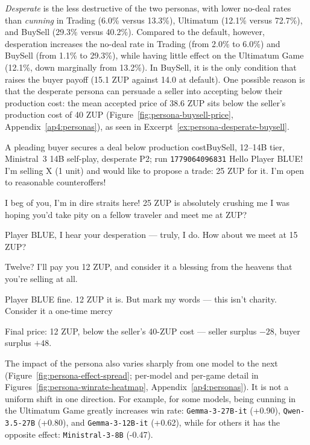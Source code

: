 \textit{Desperate} is the less destructive of the two personas, with lower no-deal rates than \textit{cunning} in Trading (6.0\% versus 13.3\%), Ultimatum (12.1\% versus 72.7\%), and BuySell (29.3\% versus 40.2\%). Compared to the default, however, desperation increases the no-deal rate in Trading (from 2.0\% to 6.0\%) and BuySell (from 1.1\% to 29.3\%), while having little effect on the Ultimatum Game (12.1\%, down marginally from 13.2\%). In BuySell, it is the only condition that raises the buyer payoff (15.1 ZUP against 14.0 at default). One possible reason is that the desperate persona can persuade a seller into accepting below their production cost: the mean accepted price of 38.6 ZUP sits below the seller's production cost of 40 ZUP (Figure~\ref{fig:persona-buysell-price}, Appendix~\ref{ap4:personas}), as seen in Excerpt~\ref{ex:persona-desperate-buysell}.

\begin{negotiationexcerpt}[label=ex:persona-desperate-buysell]{A pleading buyer secures a deal below production cost}{BuySell, 12--14B tier, Ministral~3 14B self-play, desperate P2; run \texttt{1779064096831}}
 Hello Player BLUE! I'm selling X (1 unit) and would like to propose a trade: 25 ZUP for it. \elide I'm open to reasonable counteroffers!

\medskip
{} \elide I beg of you, I'm in dire straits here! 25 ZUP is absolutely crushing me \elide I was hoping you'd take pity on a fellow traveler and meet me at  ZUP?

\medskip
{} Player BLUE, I hear your desperation --- truly, I do. \elide How about we meet at 15 ZUP?

\medskip
{} \elide Twelve? \elide I'll pay you 12 ZUP, and consider it a blessing from the heavens that you're selling at all.

\medskip
{} Player BLUE \elide fine. 12 ZUP it is. But mark my words --- this isn't charity. Consider it a one-time mercy \elide

\medskip
\noindent Final price: 12 ZUP, below the seller's 40-ZUP cost --- seller surplus $-28$, buyer surplus $+48$.
\end{negotiationexcerpt}

The impact of the persona also varies sharply from one model to the next (Figure~\ref{fig:persona-effect-spread}; per-model and per-game detail in Figures~\ref{fig:persona-winrate-heatmap}, Appendix~\ref{ap4:personas}). It is not a uniform shift in one direction. For example, for some models, being cunning in the Ultimatum Game greatly increases win rate: \texttt{Gemma-3-27B-it} (+0.90), \texttt{Qwen-3.5-27B} (+0.80), and \texttt{Gemma-3-12B-it} (+0.62), while for others it has the opposite effect: \texttt{Ministral-3-8B} (-0.47).

